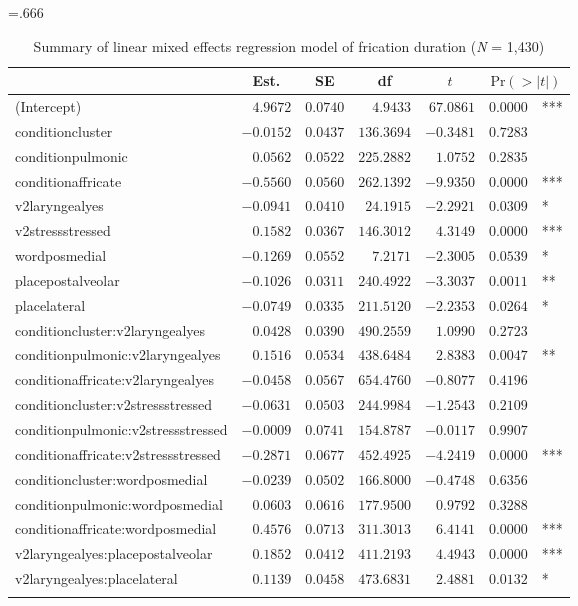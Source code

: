 \documentclass[output=paper,colorlinks,citecolor=brown]{langscibook}
\begin{document}
	\begin{table}
		\caption{Summary of linear mixed effects regression model of frication duration (\textit{N} = 1,430)}\label{Table:fricdurstats}
		\footnotesize\tabcolsep=.666\tabcolsep
		\begin{tabular}{lrrrrr@{\,}l}
			\lsptoprule
			\multicolumn{1}{l}{coef} & 
			\multicolumn{1}{c}{Est.} &
			\multicolumn{1}{c}{SE} & 
			\multicolumn{1}{c}{df} & 
			\multicolumn{1}{c}{$t$} & 
			\multicolumn{2}{c}{$\text{Pr}(>|t|)$}\\
			\midrule
			(Intercept)&$ 4.9672$&$0.0740$&$  4.9433$&$67.0861$&$0.0000$&***\\
			conditioncluster&$-0.0152$&$0.0437$&$136.3694$&$-0.3481$&$0.7283$&\\
			conditionpulmonic&$ 0.0562$&$0.0522$&$225.2882$&$ 1.0752$&$0.2835$&\\
			conditionaffricate&$-0.5560$&$0.0560$&$262.1392$&$-9.9350$&$0.0000$&***\\
			v2laryngealyes&$-0.0941$&$0.0410$&$ 24.1915$&$-2.2921$&$0.0309$&*\\
			v2stressstressed&$ 0.1582$&$0.0367$&$146.3012$&$ 4.3149$&$0.0000$&***\\
			wordposmedial&$-0.1269$&$0.0552$&$  7.2171$&$-2.3005$&$0.0539$&*\\
			placepostalveolar&$-0.1026$&$0.0311$&$240.4922$&$-3.3037$&$0.0011$&**\\
			placelateral&$-0.0749$&$0.0335$&$211.5120$&$-2.2353$&$0.0264$&*\\
			conditioncluster:v2laryngealyes&$ 0.0428$&$0.0390$&$490.2559$&$ 1.0990$&$0.2723$&\\
			conditionpulmonic:v2laryngealyes&$ 0.1516$&$0.0534$&$438.6484$&$ 2.8383$&$0.0047$&**\\
			conditionaffricate:v2laryngealyes&$-0.0458$&$0.0567$&$654.4760$&$-0.8077$&$0.4196$&\\
			conditioncluster:v2stressstressed&$-0.0631$&$0.0503$&$244.9984$&$-1.2543$&$0.2109$&\\
			conditionpulmonic:v2stressstressed&$-0.0009$&$0.0741$&$154.8787$&$-0.0117$&$0.9907$&\\
			conditionaffricate:v2stressstressed&$-0.2871$&$0.0677$&$452.4925$&$-4.2419$&$0.0000$&***\\
			conditioncluster:wordposmedial&$-0.0239$&$0.0502$&$166.8000$&$-0.4748$&$0.6356$&\\
			conditionpulmonic:wordposmedial&$ 0.0603$&$0.0616$&$177.9500$&$ 0.9792$&$0.3288$&\\
			conditionaffricate:wordposmedial&$ 0.4576$&$0.0713$&$311.3013$&$ 6.4141$&$0.0000$&***\\
			v2laryngealyes:placepostalveolar&$ 0.1852$&$0.0412$&$411.2193$&$ 4.4943$&$0.0000$&***\\
			v2laryngealyes:placelateral&$ 0.1139$&$0.0458$&$473.6831$&$ 2.4881$&$0.0132$&*\\
			\lspbottomrule
		\end{tabular}
	\end{table}
\end{document}
